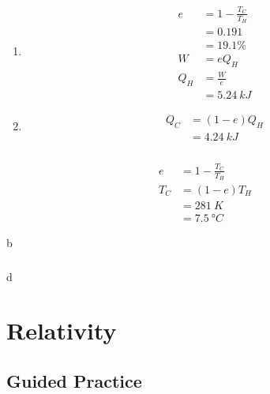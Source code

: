 \documentclass{article}
\begin{document}
\begin{enumerate}
  \item

        \begin{align*}
          e   & = 1 - \frac{T_C}{T_H} \\
              & = 0.191               \\
              & = 19.1\%              \\
          W   & = e Q_H               \\
          Q_H & = \frac{W}{e}         \\
              & = \qty{5.24}{kJ}
        \end{align*}

  \item

        \begin{align*}
          Q_C & = (1 - e) Q_H    \\
              & = \qty{4.24}{kJ}
        \end{align*}
\end{enumerate}

\setcounter{subsubsection}{58}
\subsubsection{}

\begin{align*}
  e   & = 1 - \frac{T_C}{T_H}  \\
  T_C & = (1 - e) T_H          \\
      & = \qty{281}{K}         \\
      & = \qty{7.5}{\degree C}
\end{align*}

b

\setcounter{subsubsection}{60}
\subsubsection{}

d

\setcounter{section}{36}
\section{Relativity}

\subsection{Guided Practice}

\subsubsection{}
\end{document}
